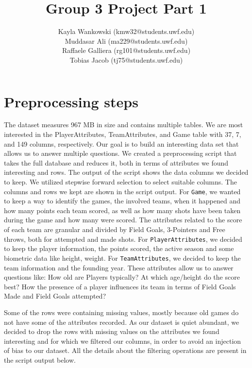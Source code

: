 \documentclass{article}
\begin{document}
\title{Group 3 Project Part 1}
\author{
    Kayla Wankowski (kmw32@students.uwf.edu)\\
    Muddasar Ali (ma229@students.uwf.edu)\\
    Raffaele Galliera (rg101@students.uwf.edu)\\
    Tobias Jacob (tj75@students.uwf.edu)
}

\maketitle

\section{Preprocessing steps}
The dataset measures 967 MB in size and contains multiple tables.
We are most interested in the PlayerAttributes, TeamAttributes, and Game table with 37, 7, and 149 columns, respectively.
Our goal is to build an interesting data set that allows us to answer multiple questions.
We created a preprocessing script that takes the full database and reduces it, both in terms of attributes we found interesting and rows.
The output of the script shows the data columns we decided to keep.
We utilized stepwise forward selection to select suitable columns.
The columns and rows we kept are shown in the script output.
For \texttt{Game}, we wanted to keep a way to identify the games, the involved teams, when it happened and how many points each team scored, as well as how many shots have been taken during the game and how many were scored. The attributes related to the score of each team are granular and divided by Field Goals, 3-Pointers and Free throws, both for attempted and made shots.
For \texttt{PlayerAttributes}, we decided to keep the player information, the points scored, the active season and some biometric data like height, weight.
For \texttt{TeamAttributes}, we decided to keep the team information and the founding year.
These attributes allow us to answer questions like: How old are Players typically? At which age/height do the score best? How the presence of a player influences its team in terms of Field Goals Made and Field Goals attempted?

Some of the rows were containing missing values, mostly because old games do not have some of the attributes recorded. As our dataset is quiet abundant, we decided to drop the rows with missing values on the attributes we found interesting and for which we filtered our columns, in order to avoid an injection of bias to our dataset. All the details about the filtering operations are present in the script output below. 
\end{document}
